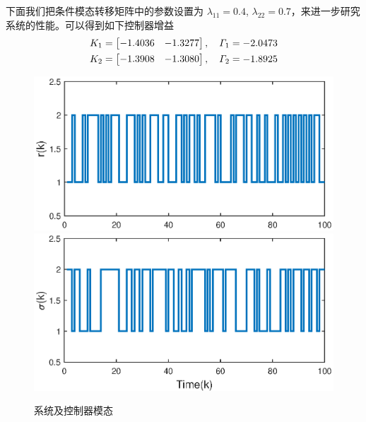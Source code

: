 下面我们把条件模态转移矩阵中的参数设置为 $\lambda_{11}=0.4$, $\lambda_{22}=0.7$，来进一步研究系统的性能。可以得到如下控制器增益
\begin{equation}\notag
\begin{aligned}
K_{1}=\begin{bmatrix}
-1.4036&-1.3277
\end{bmatrix},\quad
\varGamma_{1}=-2.0473 \\
K_{2}=\begin{bmatrix}
-1.3908&-1.3080
\end{bmatrix},\quad
\varGamma_{2}=-1.8925
\end{aligned}
\end{equation}

\begin{figure}[!htb]
	\centering\includegraphics[scale=0.6]{./figures/lure_system/mode_p5.eps}\\ 
	\centering\includegraphics[scale=0.6]{./figures/lure_system/mode_k5.eps}\\ 
	\caption{系统及控制器模态}
	\label{lure_fig2}
\end{figure}

